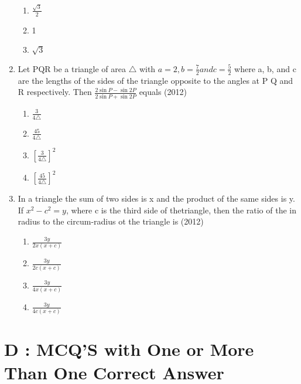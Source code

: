 \documentclass[12pt]{article}
\providecommand{\sbrak}[1]{\ensuremath{{}\left[#1\right]}}
\begin{document}
\begin{enumerate}
\begin{enumerate}
\item $\frac{\sqrt{3}}{2}$
\item 1
\item $\sqrt{3}$
\end{enumerate}
\item Let PQR be a triangle of area $\triangle$ with $a=2,b=\frac{7}{2} and c=\frac{5}{2}$ where a, b, and c are the lengths of the sides of the triangle opposite to the angles at P Q and R respectively. Then $\frac{2\sin P-\sin 2P}{2\sin P+\sin 2P}$ equals (2012)
\begin{enumerate}
\item $\frac{3}{4\triangle}$
\item $\frac{45}{4\triangle}$
\item $\sbrak{\frac{3}{4\triangle}}^2$
\item $\sbrak{\frac{45}{4\triangle}}^2$
\end{enumerate}
\item In a triangle the sum of two sides is x and the product of the same sides is y. If $x^2-c^2=y$, where c is the third side of thetriangle, then the ratio of the in radius to the circum-radius ot the triangle is (2012)
\begin{enumerate}
\item $\frac{3y}{2x(x+c)}$
\item  $\frac{3y}{2c(x+c)}$
\item  $\frac{3y}{4x(x+c)}$
\item  $\frac{3y}{4c(x+c)}$
\end{enumerate}
\end{enumerate}


\section*{D  :  MCQ'S with One or More Than One Correct Answer}
\end{document}
